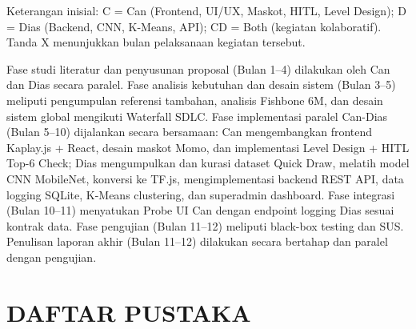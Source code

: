 \documentclass[12pt,a4paper,oneside,openany]{report}
\begin{document}
Keterangan inisial: C = Can (Frontend, UI/UX, Maskot, HITL, Level Design); D = Dias (Backend, CNN, K-Means, API); CD = Both (kegiatan kolaboratif). Tanda X menunjukkan bulan pelaksanaan kegiatan tersebut.

Fase studi literatur dan penyusunan proposal (Bulan 1--4) dilakukan oleh Can dan Dias secara paralel. Fase analisis kebutuhan dan desain sistem (Bulan 3--5) meliputi pengumpulan referensi tambahan, analisis Fishbone 6M, dan desain sistem global mengikuti Waterfall SDLC. Fase implementasi paralel Can-Dias (Bulan 5--10) dijalankan secara bersamaan: Can mengembangkan frontend Kaplay.js + React, desain maskot Momo, dan implementasi Level Design + HITL Top-6 Check; Dias mengumpulkan dan kurasi dataset Quick Draw, melatih model CNN MobileNet, konversi ke TF.js, mengimplementasi backend REST API, data logging SQLite, K-Means clustering, dan superadmin dashboard. Fase integrasi (Bulan 10--11) menyatukan Probe UI Can dengan endpoint logging Dias sesuai kontrak data. Fase pengujian (Bulan 11--12) meliputi black-box testing dan SUS. Penulisan laporan akhir (Bulan 11--12) dilakukan secara bertahap dan paralel dengan pengujian.

%
%
%
%   

\chapter*{DAFTAR PUSTAKA}
\end{document}
